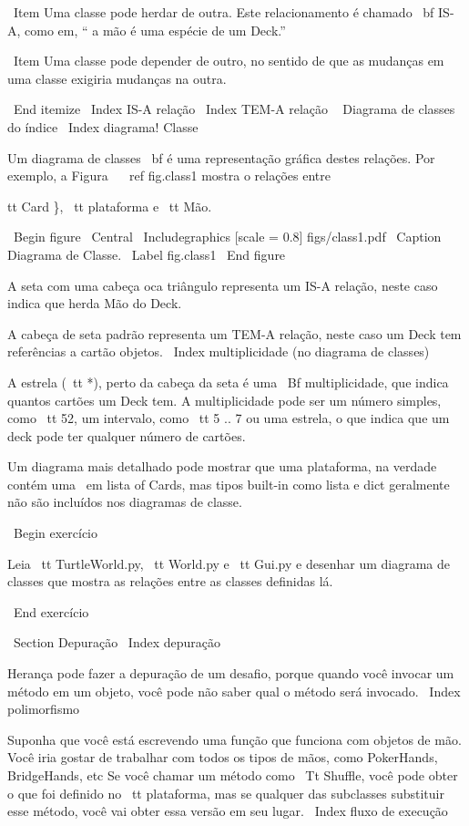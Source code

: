 \documentclass[10pt]{book}
\begin{document}
\begin {itemize}
{{{{{{{{{{{{{{{{\ Item Uma classe pode herdar de outra. Este relacionamento
é chamado {\ bf IS-A}, como em, `` a mão é uma espécie de um Deck.''

\ Item Uma classe pode depender de outro, no sentido de que as mudanças
em uma classe exigiria mudanças na outra.

\ End {itemize}
\ Index {IS-A relação}
\ Index {TEM-A relação}
\ {} Diagrama de classes do índice
\ Index {diagrama! Classe}

Um diagrama de classes {\ bf} é uma representação gráfica destes
relações. Por exemplo, a Figura ~ \ ref {fig.class1} mostra o
relações entre {tt Card \}, {\ tt plataforma} e {\ tt Mão}.

\ Begin {figure}
\ Central
{\ Includegraphics [scale = 0.8] {figs/class1.pdf}}
\ Caption {Diagrama de Classe.}
\ Label {} fig.class1
\ End {figure}


A seta com uma cabeça oca triângulo representa um IS-A
relação, neste caso indica que herda Mão
do Deck.

A cabeça de seta padrão representa um TEM-A
relação, neste caso um Deck tem referências a cartão
objetos.
\ Index {multiplicidade (no diagrama de classes)}

A estrela ({\ tt *}), perto da cabeça da seta é uma 
{\ Bf multiplicidade}, que indica quantos cartões um Deck tem.
A multiplicidade pode ser um número simples, como {\ tt 52}, um intervalo,
como {\ tt 5 .. 7} ou uma estrela, o que indica que um deck pode
ter qualquer número de cartões.

Um diagrama mais detalhado pode mostrar que uma plataforma, na verdade
contém uma {\ em lista} of Cards, mas tipos built-in
como lista e dict geralmente não são incluídos nos diagramas de classe.

\ Begin {} exercício

Leia {\ tt TurtleWorld.py}, {\ tt World.py} e {\ tt Gui.py}
e desenhar um diagrama de classes que mostra as relações entre
as classes definidas lá.

\ End {} exercício


\ Section {} Depuração
\ Index {depuração}

Herança pode fazer a depuração de um desafio, porque quando você
invocar um método em um objeto, você pode não saber qual o método
será invocado.
\ Index {polimorfismo}

Suponha que você está escrevendo uma função que funciona com objetos de mão.
Você iria gostar de trabalhar com todos os tipos de mãos, como
PokerHands, BridgeHands, etc Se você chamar um método como
{\ Tt Shuffle}, você pode obter o que foi definido no {\ tt plataforma},
mas se qualquer das subclasses substituir esse método, você vai
obter essa versão em seu lugar.  
\ Index {fluxo de execução}

}}}}}}}}}}}}}}}}}
\end{itemize}
\end{document}
